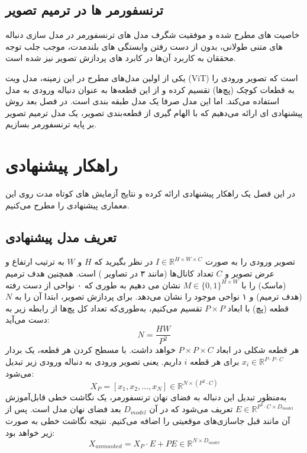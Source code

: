 \section{ترنسفورمر ها در ترمیم تصویر}

خاصیت های مطرح شده و موفقیت شگرف مدل های ترنسفورمر
\cite{radfordLanguageModelsAre2019}
\cite{brownLanguageModelsAre2020}
\cite{openaiGPT4TechnicalReport2024}
در مدل سازی دنباله های متنی طولانی، بدون از دست رفتن وابستگی های بلندمدت، موجب جلب توجه محققان به کاربرد آن‌ها در کابرد های پردازش تصویر نیز شده است.
\cite{liuSwinTransformerHierarchical2021}


یکی از اولین مدل‌های مطرح در این زمینه، مدل ویت (ViT) 
\cite{dosovitskiyImageWorth16x162021}
است که تصویر ورودی را به قطعات کوچک (پچ‌ها) تقسیم کرده و از این قطعه‌ها به عنوان دنباله ورودی به مدل استفاده می‌کند. اما این مدل صرفا یک مدل طبقه بندی است. در فصل بعد روش پیشنهادی ای ارائه می‌دهیم که با الهام گیری از قطعه‌بندی تصویر، یک مدل ترمیم تصویر بر پایه ترنسفورمر بسازیم. 



\chapter{راهکار پیشنهادی}

در این فصل یک راهکار پیشنهادی ارائه کرده و نتایج آزمایش های کوتاه مدت روی این معماری پیشنهادی را مطرح می‌کنیم.

\section{تعریف مدل پیشنهادی}

تصویر ورودی را به صورت $I \in \mathbb{R}^{H \times W \times C}$ در نظر بگیرید که $H$ و $W$ به ترتیب ارتفاع و عرض تصویر و $C$ تعداد کانال‌ها (مانند ۳ در تصاویر ) است. همچنین هدف ترمیم (ماسک) را با
$M \in \{0,1\}^{H \times W} $
نشان می دهیم به طوری که ۰ نواحی از دست رفته (هدف ترمیم) و ۱ نواحی موجود را نشان می‌دهد. برای پردازش تصویر، ابتدا آن را به $N$ قطعه (پچ) با ابعاد $P \times P$ تقسیم می‌کنیم، به‌طوری‌که تعداد کل پچ‌ها از رابطه زیر به دست می‌آید:
\[
N = \frac{HW}{P^2}
\]
هر قطعه شکلی در ابعاد ${P \times P \times C}$ خواهد داشت. با مسطح کردن هر قطعه، یک بردار 
$x_i \in \mathbb{R}^{P \cdot P \cdot C}$
برای هر قطعه $i$ داریم. یعنی تصویر ورودی به دنباله ورودی زیر تبدیل می‌شود:
\[
X_P = [x_1, x_2, \dots, x_N] \in \mathbb{R}^{N \times (P^2 \cdot C)}
\]
به‌منظور تبدیل این دنباله به فضای نهان ترنسفورمر، یک نگاشت خطی قابل‌آموزش $E \in \mathbb{R}^{P^2 \cdot C \times D_{model}}$ تعریف می‌شود که در آن $D_{model}$ بعد فضای نهان مدل است. پس از آن مانند قبل جاسازی‌های موقعیتی را اضافه می‌کنیم.
 نتیجه نگاشت خطی به صورت زیر خواهد بود:
$$
X_{unmasked} = X_P \cdot E + PE \in \mathbb{R}^{N \times D_{model}}
$$

